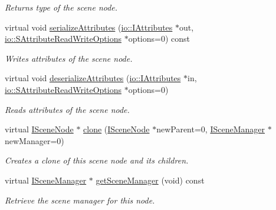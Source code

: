 \begin{DoxyCompactItemize}
\begin{DoxyCompactList}\small\item\em Returns type of the scene node. \end{DoxyCompactList}\item 
virtual void \hyperlink{classirr_1_1scene_1_1ISceneNode_a3210345b70227c03c7f889c94754fdaa}{serialize\+Attributes} (\hyperlink{classirr_1_1io_1_1IAttributes}{io\+::\+I\+Attributes} $\ast$out, \hyperlink{structirr_1_1io_1_1SAttributeReadWriteOptions}{io\+::\+S\+Attribute\+Read\+Write\+Options} $\ast$options=0) const
\begin{DoxyCompactList}\small\item\em Writes attributes of the scene node. \end{DoxyCompactList}\item 
virtual void \hyperlink{classirr_1_1scene_1_1ISceneNode_a5fb609b08fc89a92f928c19ce3b181eb}{deserialize\+Attributes} (\hyperlink{classirr_1_1io_1_1IAttributes}{io\+::\+I\+Attributes} $\ast$in, \hyperlink{structirr_1_1io_1_1SAttributeReadWriteOptions}{io\+::\+S\+Attribute\+Read\+Write\+Options} $\ast$options=0)
\begin{DoxyCompactList}\small\item\em Reads attributes of the scene node. \end{DoxyCompactList}\item 
virtual \hyperlink{classirr_1_1scene_1_1ISceneNode}{I\+Scene\+Node} $\ast$ \hyperlink{classirr_1_1scene_1_1ISceneNode_ac39832b55855dc59196053adbaec95cc}{clone} (\hyperlink{classirr_1_1scene_1_1ISceneNode}{I\+Scene\+Node} $\ast$new\+Parent=0, \hyperlink{classirr_1_1scene_1_1ISceneManager}{I\+Scene\+Manager} $\ast$new\+Manager=0)
\begin{DoxyCompactList}\small\item\em Creates a clone of this scene node and its children. \end{DoxyCompactList}\item 
virtual \hyperlink{classirr_1_1scene_1_1ISceneManager}{I\+Scene\+Manager} $\ast$ \hyperlink{classirr_1_1scene_1_1ISceneNode_a394f112e9b4a1c66f7d58e873a3f8a1d}{get\+Scene\+Manager} (void) const
\begin{DoxyCompactList}\small\item\em Retrieve the scene manager for this node. \end{DoxyCompactList}\item 
\mbox{\label{classirr_1_1scene_1_1ISceneNode_a9894d951df2f720924f891e0a7b9fac2}} 

\end{DoxyCompactItemize}
